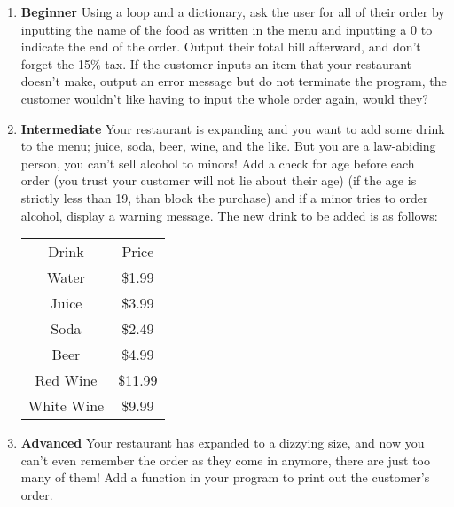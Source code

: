 \documentclass[12pt]{article}
\begin{document}
\begin{enumerate}[label=(\alph*)]
    \item \textbf{Beginner} Using a loop and a dictionary, ask the user for all of their order by inputting the name of the food as written in the menu and inputting a 0 to indicate the end of the order. Output their total bill afterward, and don't forget the 15\% tax. If the customer inputs an item that your restaurant doesn't make, output an error message but do not terminate the program, the customer wouldn't like having to input the whole order again, would they?
    \item \textbf{Intermediate} Your restaurant is expanding and you want to add some drink to the menu; juice, soda, beer, wine, and the like. But you are a law-abiding person, you can't sell alcohol to minors! Add a check for age before each order (you trust your customer will not lie about their age) (if the age is strictly less than 19, than block the purchase) and if a minor tries to order alcohol, display a warning message. The new drink to be added is as follows:
    \begin{table}[h!]
        \centering
        \begin{tabular}{c|c}
            Drink & Price \\
            \hhline{|=|=|}
            Water & \$1.99 \\
            Juice & \$3.99 \\
            Soda & \$2.49 \\
            Beer & \$4.99 \\
            Red Wine & \$11.99 \\
            White Wine & \$9.99
        \end{tabular}
    \end{table}
    
    \item \textbf{Advanced} Your restaurant has expanded to a dizzying size, and now you can't even remember the order as they come in anymore, there are just too many of them! Add a function in your program to print out the customer's order.
\end{enumerate}
\end{document}
